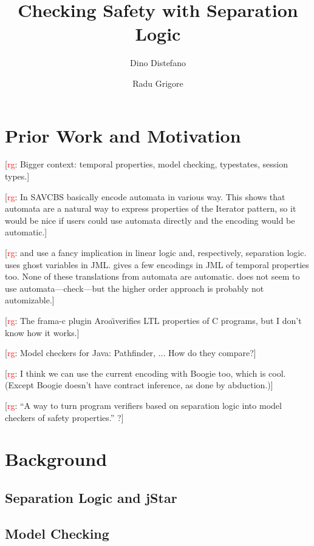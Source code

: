 \documentclass[a4paper]{article}
\title{Checking Safety with Separation Logic}
\author{Dino Distefano \and Radu Grigore}
\newcommand{\todo}[2]{{\small [\textcolor{red}{#1}: #2]}}
\newcommand{\rg}[1]{\todo{rg}{#1}}
\theoremstyle{remark}
\begin{document}
\maketitle
\section{Prior Work and Motivation}

\rg{Bigger context: temporal properties, model checking, typestates, session types.}

\rg{In SAVCBS \cite{cok2006,bierhoff2006} basically encode automata in various way. This shows that automata are a natural way to express properties of the Iterator pattern, so it would be nice if users could use automata directly and the encoding would be automatic.}

\rg{\cite{bierhoff2006} and \cite{haack2009} use a fancy implication in linear logic and, respectively, separation logic. \cite{cok2006} uses ghost variables in JML. \cite{trentelman2002} gives a few encodings in JML of temporal properties too. None of these translations from automata are automatic. \cite{krishnaswami2006} does not seem to use automata---check---but the higher order approach is probably not automizable.}

\rg{The frama-c plugin Aroa\"\i verifies LTL properties of C programs, but I don't know how it works.}

\rg{Model checkers for Java: Pathfinder, $\ldots$ How do they compare?}

\rg{I think we can use the current encoding with Boogie too, which is cool. (Except Boogie doesn't have contract inference, as done by abduction.)}

\rg{``A way to turn program verifiers based on separation logic into model checkers of safety properties.'' ?}

\section{Background}
\subsection{Separation Logic and jStar} %
\subsection{Model Checking} %

\end{document}
